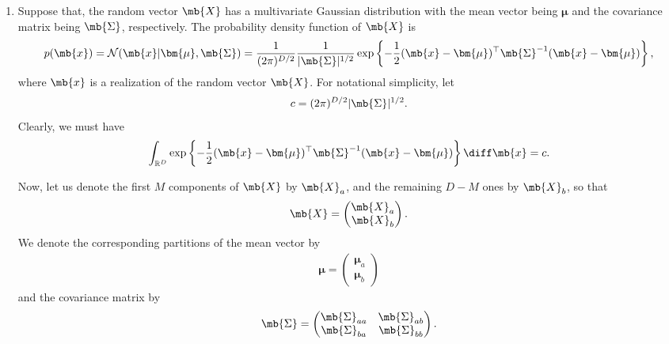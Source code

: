 \begin{exercise}
\begin{enumerate}
        \item Suppose that, the random vector $\mb{X}$ has a multivariate Gaussian distribution with the mean vector being $\bm{\mu}$ and the covariance matrix being $\mb{\Sigma}$, respectively. The probability density function of $\mb{X}$ is
            \begin{align*}
                p(\mb{x})=\mathcal{N}(\mb{x}|\bm{\mu},\mb{\Sigma})=\frac{1}{(2\pi)^{D/2}}\frac{1}{|\mb{\Sigma}|^{1/2}}\exp\left\{-\frac{1}{2}(\mb{x}-\bm{\mu})^{\top}\mb{\Sigma}^{-1}(\mb{x}-\bm{\mu})\right\},
            \end{align*}
            where $\mb{x}$ is a realization of the random vector $\mb{X}$.
            For notational simplicity, let
            \begin{align}\label{eqn:cx}
                c=(2\pi)^{D/2}|\mb{\Sigma}|^{1/2}.
            \end{align}
            Clearly, we must have
            \begin{align}\label{eqn:cx-int}
                \int_{\mathbb{R}^D}\exp\left\{-\frac{1}{2}(\mb{x}-\bm{\mu})^{\top}\mb{\Sigma}^{-1}(\mb{x}-\bm{\mu})\right\}\diff\mb{x}=c.
            \end{align}
            
            Now, let us denote the first $M$ components of $\mb{X}$ by $\mb{X}_a$, and the remaining $D-M$ ones by $\mb{X}_b$, so that
            \begin{align*}
                \mb{X}=
                \begin{pmatrix}
                    \mb{X}_a \\
                    \mb{X}_b
                \end{pmatrix}.
            \end{align*}
            We denote the corresponding partitions of the mean vector by
            \begin{align*}
                \bm{\mu}=
                \begin{pmatrix}
                    \bm{\mu}_a \\
                    \bm{\mu}_b
                \end{pmatrix}
            \end{align*}
            and the covariance matrix by
            \begin{align*}
                \mb{\Sigma}=
                \begin{pmatrix}
                    \mb{\Sigma}_{aa} & \mb{\Sigma}_{ab} \\
                    \mb{\Sigma}_{ba} & \mb{\Sigma}_{bb}
                \end{pmatrix}.
            \end{align*}
            

\end{enumerate}
\end{exercise}
